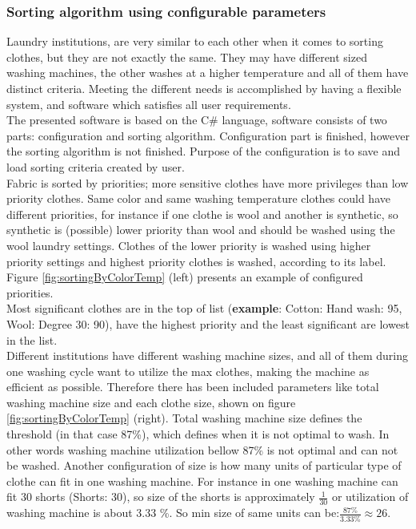 \subsubsection{Sorting algorithm using configurable parameters}

Laundry institutions, are very similar to each other when it comes to sorting clothes, but they are not exactly the same. They may have different sized washing machines, the other washes at a higher temperature and all of them have distinct criteria. Meeting the different needs is accomplished by having a flexible system, and software which satisfies all user requirements. \\  The presented software is based on the C\# language, software consists of two parts: configuration and sorting algorithm. Configuration part is finished, however the sorting algorithm is not finished. Purpose of the configuration is to save and load sorting criteria created by user. 
\\
Fabric is sorted by priorities; more sensitive clothes have more privileges than low priority clothes. Same color and same washing temperature clothes could have different priorities, for instance if one clothe is wool and another is synthetic, so synthetic is (possible) lower priority than wool and should be washed using the wool laundry settings. Clothes of the lower priority is washed using higher priority settings and highest priority clothes is washed, according to its label. Figure \ref{fig:sortingByColorTemp} (left) presents an example of configured priorities. \\ Most significant clothes are in the top of list (\textbf{example}: Cotton: Hand wash: 95, Wool: Degree 30: 90),  have the highest priority and the least significant are lowest in the list. 
\\
Different institutions have different washing machine sizes, and all of them during one washing cycle want to utilize the max clothes, making the machine as efficient as possible. Therefore there has been included parameters like total washing machine size and each clothe size, shown on figure \ref{fig:sortingByColorTemp} (right). Total washing machine size defines the threshold (in that case 87\%), which defines when it is not optimal to wash. In other words washing machine utilization bellow 87\% is not optimal and can not be washed. Another configuration of size is how many units of particular type of clothe can fit in one washing machine. For instance in one washing machine can fit 30 shorts (Shorts: 30), so size of the shorts is approximately $\frac{1}{30}$ or utilization of washing machine is about 3.33 \%. So min size of same units can be:$\frac{87\%}{3.33\%}\approx 26$. \\

